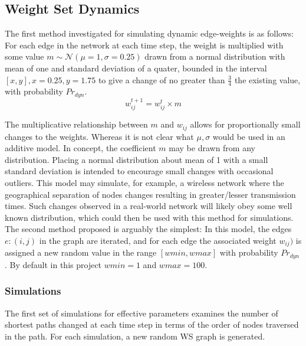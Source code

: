 \documentclass[
	a4paper, %
	10pt, %
	unnumberedsections, %
	twoside, %
]{LTJournalArticle}
\begin{document}
\subsection{Weight Set Dynamics}

The first method investigated for simulating dynamic edge-weights is as follows: For each edge in the network at each time step, the weight is multiplied with some value \(m \sim \mathcal{N}(\mu = 1, \sigma = 0.25)\) drawn from a normal distribution with mean of one and standard deviation of a quater, bounded in the interval \([x, y], x = 0.25, y = 1.75\) to give a change of no greater than \(\frac{3}{4}\) the existing value, with probability \(Pr_{dyn}\). \\

\begin{equation}
	w_{ij}^{t+1} = w_{ij}^{t} \times m
	\label{eq:weight_mult}
\end{equation}

The multiplicative relationship between \(m\) and \(w_{ij}\) allows for proportionally small changes to the weights. Whereas it is not clear what \(\mu, \sigma\) would be used in an additive model. In concept, the coefficient \(m\) may be drawn from any distribution. Placing a normal distribution about mean of 1 with a small standard deviation is intended to encourage small changes with occasional outliers. This model may simulate, for example, a wireless network where the geographical separation of nodes changes resulting in greater/lesser transmission times. Such changes observed in a real-world network will likely obey some well known distribution, which could then be used with this method for simulations. \\

The second method proposed is arguably the simplest: In this model, the edges \(e: (i, j)\) in the graph are iterated, and for each edge the associated weight \(w_{ij})\) is assigned a new random value in the range \([wmin, wmax]\) with probability \(Pr_{dyn}\). By default in this project \(wmin = 1\) and \(wmax = 100\).  \\

\subsubsection{Simulations}

The first set of simulations for effective parameters examines the number of shortest paths changed at each time step in terms of the order of nodes traversed in the path. For each simulation, a new random WS graph is generated. 
\end{document}
